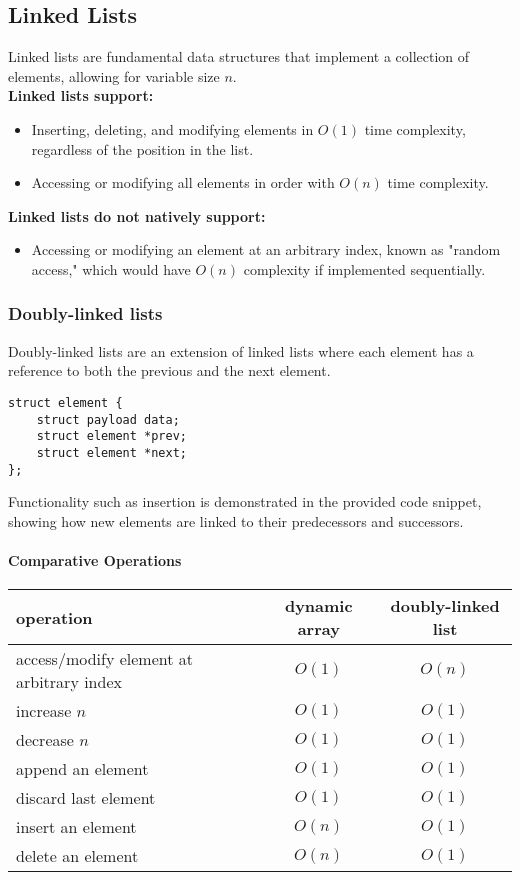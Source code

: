 \documentclass[12pt]{article}
\begin{document}
\subsection{Linked Lists}
Linked lists are fundamental data structures that implement a collection of elements, allowing for variable size \( n \).\\

\textbf{Linked lists support:}
\begin{itemize}
    \item Inserting, deleting, and modifying elements in \( O(1) \) time complexity, regardless of the position in the list.
    \item Accessing or modifying all elements in order with \( O(n) \) time complexity.
\end{itemize}

\textbf{Linked lists do not natively support:}
\begin{itemize}
    \item Accessing or modifying an element at an arbitrary index, known as "random access," which would have \( O(n) \) complexity if implemented sequentially.
\end{itemize}


\subsubsection{Doubly-linked lists}

Doubly-linked lists are an extension of linked lists where each element has a reference to both the previous and the next element.

\begin{lstlisting}
struct element {
    struct payload data;
    struct element *prev;
    struct element *next;
};
\end{lstlisting}

Functionality such as insertion is demonstrated in the provided code snippet, showing how new elements are linked to their predecessors and successors.

\paragraph{Comparative Operations}
\begin{tabular}{lcc}
\hline
\textbf{operation} & \textbf{dynamic array} & \textbf{doubly-linked list} \\
\hline
access/modify element at arbitrary index & \(O(1)\) & \(O(n)\) \\
increase \(n\) & \(O(1)\) & \(O(1)\) \\
decrease \(n\) & \(O(1)\) & \(O(1)\) \\
append an element & \(O(1)\) & \(O(1)\) \\
discard last element & \(O(1)\) & \(O(1)\) \\
insert an element & \(O(n)\) & \(O(1)\) \\
delete an element & \(O(n)\) & \(O(1)\) \\
\hline
\end{tabular}
\end{document}
